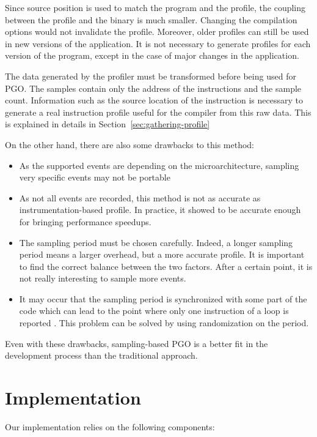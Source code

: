 \documentclass[9pt,english,twocolumn,letter]{article}
\begin{document}
Since source position is used to match the program and the profile, the coupling between the profile and the binary is much smaller. Changing the compilation options would not invalidate the profile. Moreover, older profiles can still be used in new versions of the application. It is not necessary to generate profiles for each version of the program, except in the case of major changes in the application.

The data generated by the profiler must be transformed before being used for PGO. The samples contain only the address of the instructions and the sample count. Information such as the source location of the instruction is necessary to generate a real instruction profile useful for the compiler from this raw data. This is explained in details in Section~\ref{sec:gathering-profile}

On the other hand, there are also some drawbacks to this method:
\begin{itemize}
    \item As the supported events are depending on the microarchitecture, sampling very specific events may not be portable
    \item As not all events are recorded, this method is not as accurate as instrumentation-based profile. In practice, it showed to be accurate enough for bringing performance speedups.
    \item The sampling period must be chosen carefully. Indeed, a longer sampling period means a larger overhead, but a more accurate profile. It is important to find the correct balance between the two factors. After a certain point, it is not really interesting to sample more events.
    \item It may occur that the sampling period is synchronized with some part of the code which can lead to the point where only one instruction of a loop is reported \cite{Chen2010}. This problem can be solved by using randomization on the period.
\end{itemize}

Even with these drawbacks, sampling-based PGO is a better fit in the development process than the traditional approach.

\section{Implementation}
\label{sec:implementation}

Our implementation relies on the following components:
\end{document}
